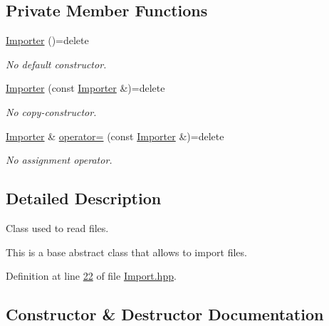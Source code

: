 \subsection*{Private Member Functions}
\begin{DoxyCompactItemize}
\item 
\hyperlink{classFVCode3D_1_1Importer_aa25a0173d8a73424d82ccefd0f1bda07}{Importer} ()=delete
\begin{DoxyCompactList}\small\item\em No default constructor. \end{DoxyCompactList}\item 
\hyperlink{classFVCode3D_1_1Importer_a0112d27364ef8c9e29ff51968670e90c}{Importer} (const \hyperlink{classFVCode3D_1_1Importer}{Importer} \&)=delete
\begin{DoxyCompactList}\small\item\em No copy-\/constructor. \end{DoxyCompactList}\item 
\hyperlink{classFVCode3D_1_1Importer}{Importer} \& \hyperlink{classFVCode3D_1_1Importer_a2559d25ef11c7a21e97bb4d17b51aaaf}{operator=} (const \hyperlink{classFVCode3D_1_1Importer}{Importer} \&)=delete
\begin{DoxyCompactList}\small\item\em No assignment operator. \end{DoxyCompactList}\end{DoxyCompactItemize}


\subsection{Detailed Description}
Class used to read files. 

This is a base abstract class that allows to import files. 

Definition at line \hyperlink{Import_8hpp_source_l00022}{22} of file \hyperlink{Import_8hpp_source}{Import.\+hpp}.



\subsection{Constructor \& Destructor Documentation}

